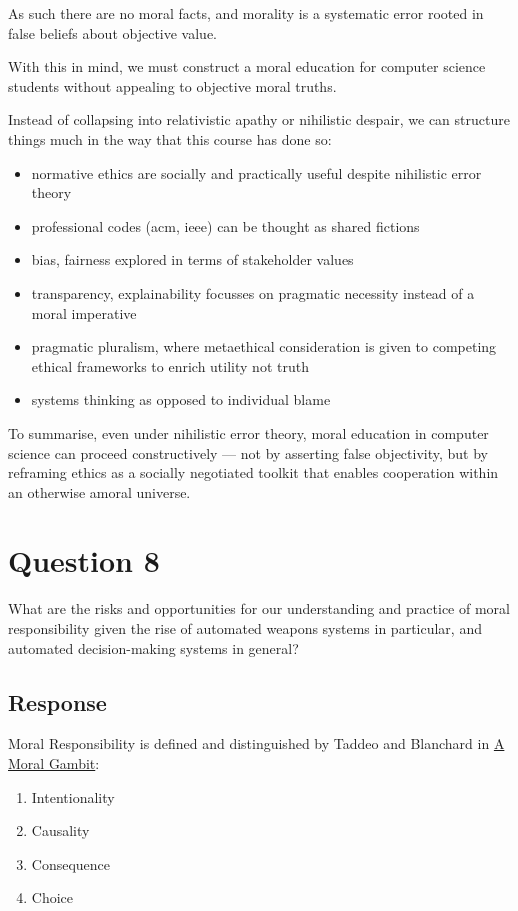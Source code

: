 \documentclass{scrartcl}
\begin{document}
As such there are no moral facts, and morality is a systematic error rooted in false beliefs about objective value.

With this in mind, we must construct a moral education for computer science students without appealing to objective moral truths. 

Instead of collapsing into relativistic apathy or nihilistic despair, we can structure things much in the way that this course has done so:

\begin{itemize}
    \item normative ethics are socially and practically useful despite nihilistic error theory
    \item professional codes (acm, ieee) can be thought as shared fictions
    \item bias, fairness explored in terms of stakeholder values
    \item transparency, explainability focusses on pragmatic necessity instead of a moral imperative
    \item pragmatic pluralism, where metaethical consideration is given to competing ethical frameworks to enrich utility not truth
    \item systems thinking as opposed to individual blame
\end{itemize}

To summarise, even under nihilistic error theory, moral education in computer science can proceed constructively — not by asserting false objectivity, but by reframing ethics as a socially negotiated toolkit that enables cooperation within an otherwise amoral universe.


\newpage
\section{Question 8}
\begin{tcolorbox}[colback=white,colframe=purple, sharp corners]
    What are the risks and opportunities for our understanding and practice of moral responsibility given the rise of automated weapons systems in particular, and automated decision-making systems in general?
\end{tcolorbox}

\subsection{Response}
Moral Responsibility is defined and distinguished by Taddeo and Blanchard in \underline{A Moral Gambit}:
\begin{enumerate}
    \item Intentionality
    \item Causality
    \item Consequence
    \item Choice
\end{enumerate}
\end{document}
